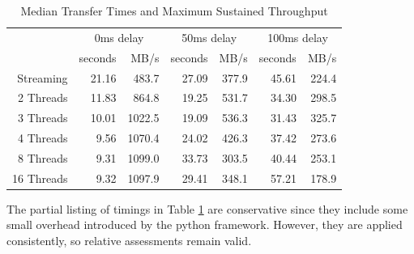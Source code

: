 \documentclass[letter, 11pt]{article}
\begin{document}
\begin{table}[h]
\centering
\begin{tabular}{r|rr|rr|rr}
 & \multicolumn{2}{c}{0ms delay} & \multicolumn{2}{c}{50ms delay} & \multicolumn{2}{c}{100ms delay} \\
 & seconds & MB/s & seconds & MB/s & seconds & MB/s \\
\hline
 Streaming  &  21.16  &   483.7  &  27.09  &  377.9  &  45.61  &  224.4 \\
 2 Threads  &  11.83  &   864.8  &  19.25  &  531.7  &  34.30  &  298.5 \\
 3 Threads  &  10.01  &  1022.5  &  19.09  &  536.3  &  31.43  &  325.7 \\ 
 4 Threads  &   9.56  &  1070.4  &  24.02  &  426.3  &  37.42  &  273.6 \\
 8 Threads  &   9.31  &  1099.0  &  33.73  &  303.5  &  40.44  &  253.1 \\
16 Threads  &   9.32  &  1097.9  &  29.41  &  348.1  &  57.21  &  178.9 \\
\end{tabular}
\caption{Median Transfer Times and Maximum Sustained Throughput}
\label{419-transfer-times}
\end{table}

The partial listing of timings in Table \ref{419-transfer-times} are conservative since they include
some small overhead introduced by the python framework.  However, they are applied consistently, so relative assessments remain valid.
\end{document}

